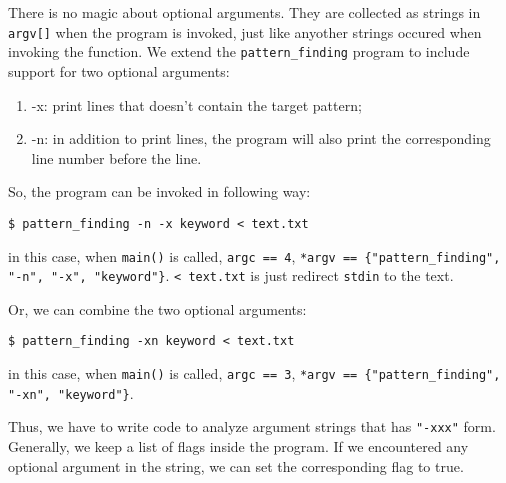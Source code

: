 \documentclass[12pt]{article}
\begin{document}
There is no magic about optional arguments. They are collected as strings in \texttt{argv[]} when the program is invoked, just like anyother strings occured when invoking the function. We extend the \texttt{pattern\_finding} program to include support for two optional arguments:
\begin{enumerate}
\item -x: print lines that doesn't contain the target pattern;
\item -n: in addition to print lines, the program will also print the corresponding line number before the line.
\end{enumerate}
So, the program can be invoked in following way:
\begin{verbatim}
$ pattern_finding -n -x keyword < text.txt
\end{verbatim}
in this case, when \texttt{main()} is called, \texttt{argc == 4}, \texttt{*argv == \{"pattern\_finding", "-n", "-x", "keyword"\}}. \texttt{< text.txt} is just redirect \texttt{stdin} to the text.

Or, we can combine the two optional arguments:
\begin{verbatim}
$ pattern_finding -xn keyword < text.txt
\end{verbatim}
in this case, when \texttt{main()} is called, \texttt{argc == 3}, \texttt{*argv == \{"pattern\_finding", "-xn", "keyword"\}}.

Thus, we have to write code to analyze argument strings that has \texttt{"-xxx"} form. Generally, we keep a list of flags inside the program. If we encountered any optional argument in the string, we can set the corresponding flag to true.
\end{document}
